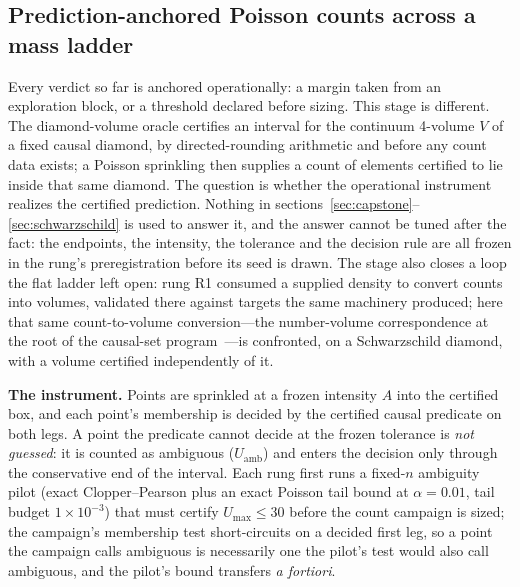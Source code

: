 \subsection{Prediction-anchored Poisson counts across a mass ladder}\label{sec:count}

Every verdict so far is anchored operationally: a margin taken from an
exploration block, or a threshold declared before sizing. This stage is
different. The diamond-volume oracle certifies an interval for the continuum
4-volume $V$ of a fixed causal diamond, by directed-rounding arithmetic and
before any count data exists; a Poisson sprinkling then supplies a count of
elements certified to lie inside that same diamond. The question is whether
the operational instrument realizes the certified prediction. Nothing in
sections~\ref{sec:capstone}--\ref{sec:schwarzschild} is used to answer it,
and the answer cannot be tuned after the fact: the endpoints, the intensity,
the tolerance and the decision rule are all frozen in the rung's
preregistration before its seed is drawn. The stage also closes a loop the
flat ladder left open: rung R1 consumed a supplied density to convert counts
into volumes, validated there against targets the same machinery produced;
here that same count-to-volume conversion---the number-volume correspondence
at the root of the causal-set program~\cite{sorkin1997forks}---is
confronted, on a Schwarzschild diamond, with a volume certified
independently of it.

\textbf{The instrument.} Points are sprinkled at a frozen intensity $A$ into
the certified box, and each point's membership is decided by the certified
causal predicate on both legs. A point the predicate cannot decide at the
frozen tolerance is \emph{not guessed}: it is counted as ambiguous
($U_{\mathrm{amb}}$) and enters the decision only through the conservative
end of the interval. Each rung first runs a fixed-$n$ ambiguity pilot (exact
Clopper--Pearson plus an exact Poisson tail bound at $\alpha = 0.01$, tail
budget $1\times10^{-3}$) that must certify $U_{\mathrm{max}} \le 30$ before
the count campaign is sized; the campaign's membership test short-circuits
on a decided first leg, so a point the campaign calls ambiguous is
necessarily one the pilot's test would also call ambiguous, and the pilot's
bound transfers \emph{a fortiori}.

